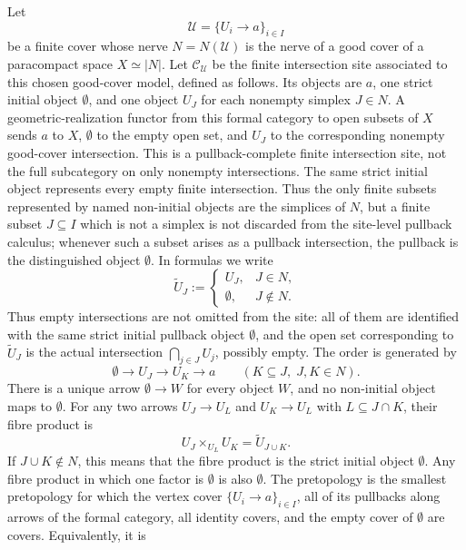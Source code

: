 \begin{lemma}\label{lem:generated-subsite-model-interface}
Let
\[
\mathcal U=\{U_i\to a\}_{i\in I}
\]
be a finite cover whose nerve $N=N(\mathcal U)$ is the nerve of a good cover
of a paracompact space $X\simeq |N|$. Let $\mathcal C_{\mathcal U}$ be the
finite intersection site associated to this chosen good-cover model, defined
as follows. Its objects are $a$, one strict initial object $\emptyset$, and
one object $U_J$ for each nonempty simplex $J\in N$. A geometric-realization functor
from this formal category to open subsets of \(X\) sends \(a\) to \(X\),
\(\emptyset\) to the empty open set, and \(U_J\) to the corresponding
nonempty good-cover intersection. This is a pullback-complete finite intersection site,
not the full subcategory on only nonempty intersections. The same strict
initial object represents every empty finite intersection. Thus the only
finite subsets represented by named non-initial objects are the simplices
of \(N\), but a finite subset \(J\subseteq I\) which is not a simplex is
not discarded from the site-level pullback calculus; whenever such a
subset arises as a pullback intersection, the pullback is the
distinguished object \(\emptyset\). In formulas
we write
\[
\widetilde U_J:=
\begin{cases}
U_J,& J\in N,\\
\emptyset,& J\notin N.
\end{cases}
\]
Thus empty intersections are not omitted from the site: all of them are
identified with the same strict initial pullback object $\emptyset$, and
the open set corresponding to \(\widetilde U_J\) is the actual intersection
\(\bigcap_{j\in J}U_j\), possibly empty. The order is generated by
\[
\emptyset\to U_J\to U_K\to a
\qquad (K\subseteq J,\; J,K\in N).
\]
There is a unique arrow \(\emptyset\to W\) for every object \(W\), and no
non-initial object maps to \(\emptyset\).
For any two arrows $U_J\to U_L$ and $U_K\to U_L$ with
$L\subseteq J\cap K$, their fibre product is
\[
U_J\times_{U_L}U_K=\widetilde U_{J\cup K}.
\]
If $J\cup K\notin N$, this means that the fibre product is the strict
initial object $\emptyset$. Any fibre product in which one factor is
$\emptyset$ is also $\emptyset$. The pretopology is the smallest
pretopology for which the vertex cover \(\{U_i\to a\}_{i\in I}\), all of
its pullbacks along arrows of the formal category, all identity covers,
and the empty cover of \(\emptyset\) are covers. Equivalently, it is

\end{lemma}
